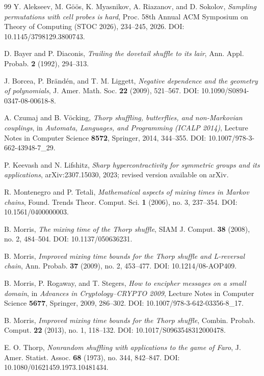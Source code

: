 \documentclass[11pt]{article}
\numberwithin{equation}{section}
\theoremstyle{definition}\newtheorem{definition}[theorem]{Definition}
\theoremstyle{remark}\newtheorem{remark}[theorem]{Remark}
\begin{document}
\begin{thebibliography}{99}
Y. Alekseev, M. G\"o\"os, K. Myasnikov, A. Riazanov, and D. Sokolov,
\emph{Sampling permutations with cell probes is hard},
Proc. 58th Annual ACM Symposium on Theory of Computing (STOC 2026), 234--245,
2026. DOI: 10.1145/3798129.3800743.

D. Bayer and P. Diaconis,
\emph{Trailing the dovetail shuffle to its lair},
Ann. Appl. Probab. \textbf{2} (1992), 294--313.

J. Borcea, P. Br\"and\'en, and T. M. Liggett,
\emph{Negative dependence and the geometry of polynomials},
J. Amer. Math. Soc. \textbf{22} (2009), 521--567.
DOI: 10.1090/S0894-0347-08-00618-8.

A. Czumaj and B. V\"ocking,
\emph{Thorp shuffling, butterflies, and non-Markovian couplings},
in \emph{Automata, Languages, and Programming (ICALP 2014)},
Lecture Notes in Computer Science \textbf{8572}, Springer, 2014, 344--355.
DOI: 10.1007/978-3-662-43948-7\_29.

P. Keevash and N. Lifshitz,
\emph{Sharp hypercontractivity for symmetric groups and its applications},
arXiv:2307.15030, 2023; revised version available on arXiv.

R. Montenegro and P. Tetali,
\emph{Mathematical aspects of mixing times in Markov chains},
Found. Trends Theor. Comput. Sci. \textbf{1} (2006), no. 3, 237--354.
DOI: 10.1561/0400000003.

B. Morris,
\emph{The mixing time of the Thorp shuffle},
SIAM J. Comput. \textbf{38} (2008), no. 2, 484--504.
DOI: 10.1137/050636231.

B. Morris,
\emph{Improved mixing time bounds for the Thorp shuffle and L-reversal chain},
Ann. Probab. \textbf{37} (2009), no. 2, 453--477.
DOI: 10.1214/08-AOP409.

B. Morris, P. Rogaway, and T. Stegers,
\emph{How to encipher messages on a small domain},
in \emph{Advances in Cryptology--CRYPTO 2009}, Lecture Notes in Computer
Science \textbf{5677}, Springer, 2009, 286--302.
DOI: 10.1007/978-3-642-03356-8\_17.

B. Morris,
\emph{Improved mixing time bounds for the Thorp shuffle},
Combin. Probab. Comput. \textbf{22} (2013), no. 1, 118--132.
DOI: 10.1017/S0963548312000478.

E. O. Thorp,
\emph{Nonrandom shuffling with applications to the game of Faro},
J. Amer. Statist. Assoc. \textbf{68} (1973), no. 344, 842--847.
DOI: 10.1080/01621459.1973.10481434.
\end{thebibliography}
\end{document}
